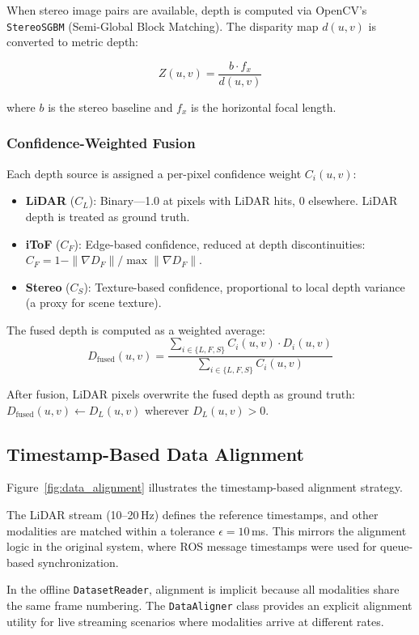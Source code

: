 When stereo image pairs are available, depth is computed via OpenCV's
\texttt{StereoSGBM} (Semi-Global Block Matching). The disparity map $d(u,v)$
is converted to metric depth:

\begin{equation}
    Z(u,v) = \frac{b \cdot f_x}{d(u,v)}
\end{equation}

where $b$ is the stereo baseline and $f_x$ is the horizontal focal length.

\subsubsection{Confidence-Weighted Fusion}

Each depth source is assigned a per-pixel confidence weight $C_i(u,v)$:

\begin{itemize}
    \item \textbf{LiDAR} ($C_L$): Binary---1.0 at pixels with LiDAR hits,
    0 elsewhere. LiDAR depth is treated as ground truth.

    \item \textbf{iToF} ($C_F$): Edge-based confidence, reduced at depth
    discontinuities:
    $C_F = 1 - \|\nabla D_F\| / \max\|\nabla D_F\|$.

    \item \textbf{Stereo} ($C_S$): Texture-based confidence, proportional
    to local depth variance (a proxy for scene texture).
\end{itemize}

The fused depth is computed as a weighted average:
\begin{equation}
    D_{\text{fused}}(u,v) = \frac{\sum_{i \in \{L, F, S\}} C_i(u,v) \cdot D_i(u,v)}
                                  {\sum_{i \in \{L, F, S\}} C_i(u,v)}
\end{equation}

After fusion, LiDAR pixels overwrite the fused depth as ground truth:
$D_{\text{fused}}(u,v) \leftarrow D_L(u,v)$ wherever $D_L(u,v) > 0$.

\subsection{Timestamp-Based Data Alignment}

Figure~\ref{fig:data_alignment} illustrates the timestamp-based alignment
strategy.



The LiDAR stream (10--20\,Hz) defines the reference timestamps,
and other modalities are matched within a tolerance
$\epsilon = 10$\,ms. This mirrors the alignment logic in the original
\gaussianlic{} system, where ROS message timestamps were used for
queue-based synchronization.

In the offline \texttt{DatasetReader}, alignment is implicit because all
modalities share the same frame numbering. The \texttt{DataAligner}
class provides an explicit alignment utility for live streaming scenarios
where modalities arrive at different rates.
